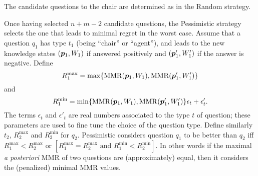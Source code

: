 \documentclass[runningheads]{llncs}
\begin{document}
The candidate questions to the chair are determined as in the Random strategy.

Once having selected $n + m - 2$ candidate questions, the Pessimistic strategy selects the one that leads to minimal regret in the worst case.
Assume that a question $q_1$ has type $t_1$ (being “chair” or “agent”), and leads to the new knowledge states $({\bm{p}}_1, W_1)$ if answered positively and $({\bm{p}}'_1, W'_1)$ if the answer is negative. 
Define \[R^{\max}_1 = \max\{\operatorname{MMR}({\bm{p}}_1, W_1), \operatorname{MMR}({\bm{p}}'_1, W'_1)\}\]
and \[R^{\min}_1 = \min\{\operatorname{MMR}({\bm{p}}_1, W_1), \operatorname{MMR}({\bm{p}}'_1, W'_1)\} \epsilon_{t} + \epsilon'_{t}.\]
The terms $\epsilon_t$ and $\epsilon'_{t}$ are real numbers associated to the type $t$ of question; these parameters are used to fine tune the choice of the question type. 
Define similarly $t_2$, $R^{\max}_2$ and $R^{\min}_2$ for  $q_2$.
Pessimistic considers question $q_1$ to be better  than $q_2$ iff $R^{\max}_1 < R^{\max}_2 \text{ or } [R^{\max}_1 = R^{\max}_2 \text{ and } R^{\min}_1 < R^{\min}_2]$.
In other words if the maximal {\em a posteriori} MMR of two questions are (approximately) equal, then it considers the (penalized) minimal MMR values. %
\end{document}
